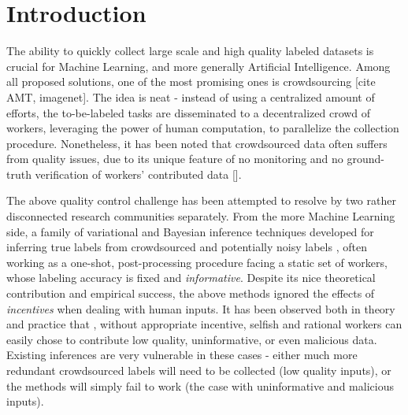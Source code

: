 \section{Introduction}
The ability to quickly collect large scale and high quality labeled datasets is crucial for Machine Learning, and more generally Artificial Intelligence. Among all proposed solutions, one of the most promising ones is crowdsourcing \cite{} [cite AMT, imagenet]. The idea is neat - instead of using a centralized amount of efforts, the to-be-labeled tasks are disseminated to a decentralized crowd of workers, leveraging the power of human computation, to parallelize the collection procedure. Nonetheless, it has been noted that crowdsourced data often suffers from quality issues, due to its unique feature of no monitoring and no ground-truth verification of workers' contributed data \cite{}[]. 

The above quality control challenge has been attempted to resolve by two rather disconnected research communities separately. From the more Machine Learning side, a family of variational and Bayesian inference techniques developed for inferring true labels from crowdsourced and potentially noisy labels \cite{}, often working as a one-shot, post-processing procedure facing a static set of workers, whose labeling accuracy is fixed and \emph{informative}. Despite its nice theoretical contribution and empirical success, the above methods ignored the effects of \emph{incentives} when dealing with human inputs. It has been observed both in theory and practice that \cite{}, without appropriate incentive, selfish and rational workers can easily chose to contribute low quality, uninformative, or even malicious data. Existing inferences are very vulnerable in these cases - either much more redundant crowdsourced labels will need to be collected (low quality inputs), or the methods will simply fail to work (the case with uninformative and malicious inputs). 

